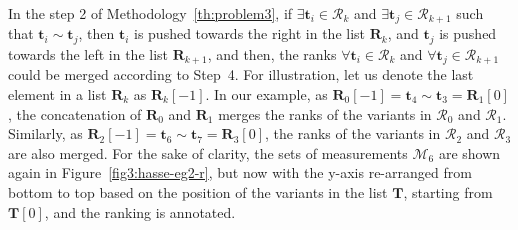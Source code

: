 \documentclass[acmsmall,screen, review]{acmart}
\begin{document}
In the step 2 of Methodology~\ref{th:problem3},  if $\exists \mathbf{t}_i \in \mathcal{R}_k$ and $\exists \mathbf{t}_j \in \mathcal{R}_{k+1}$ such that $\mathbf{t}_i \sim \mathbf{t}_j$, then $\mathbf{t}_i$ is pushed towards the right in the list $\mathbf{R}_k$, and $\mathbf{t}_j$ is pushed towards the left in the list $\mathbf{R}_{k+1}$, and then, the ranks $\forall \mathbf{t}_i \in \mathcal{R}_k$ and $\forall \mathbf{t}_j \in \mathcal{R}_{k+1}$ could be merged according to Step~4. For illustration, 
let us denote the last element in a list $\mathbf{R}_k$ as $\mathbf{R}_k[-1]$. In our example, as $\mathbf{R}_0[-1] = \mathbf{t}_4 \sim \mathbf{t}_3 = \mathbf{R}_1[0] $,  the concatenation of $\mathbf{R}_0$ and $\mathbf{R}_1$ merges the ranks of the variants in $\mathcal{R}_0$ and $\mathcal{R}_1$. Similarly, as $\mathbf{R}_2[-1] = \mathbf{t}_6 \sim \mathbf{t}_7 = \mathbf{R}_3[0]$, the ranks of the variants in $\mathcal{R}_2$ and $\mathcal{R}_3$ are also merged. For the sake of clarity, the sets of measurements $\mathcal{M}_6$ are shown again in Figure~\ref{fig3:hasse-eg2-r}, but now with the y-axis re-arranged from bottom to top based on the position of the variants in the list $\mathbf{T}$, starting from $\mathbf{T}[0]$, and the ranking is annotated. 
\end{document}
